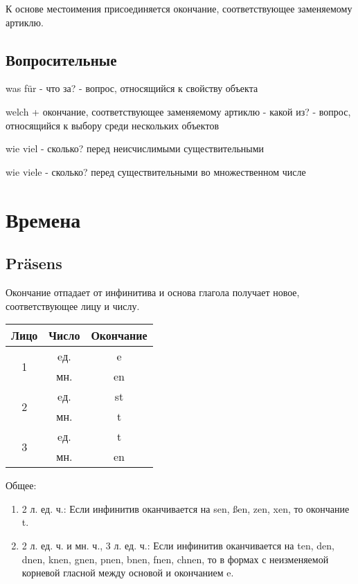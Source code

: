 \documentclass[oneside]{book}
\begin{document}
    К основе местоимения присоединяется окончание, соответствующее
    заменяемому артиклю.

    \section{Вопросительные}
    was f\"ur - что за? - вопрос, относящийся к свойству объекта

    welch + окончание, соответствующее заменяемому артиклю -
    какой из? - вопрос, относящийся к выбору среди нескольких объектов

    wie viel - сколько? перед неисчислимыми существительными

    wie viele - сколько? перед существительными во множественном числе

    \chapter{Времена}
    \section{Pr\"asens}
    Окончание отпадает от инфинитива и основа глагола
    получает новое, соответствующее лицу и числу.

    \begin{center}
        \begin{tabular}{|c|c|c|}
            \hline
            Лицо               & Число & Окончание \\ \hline
            \multirow{2}{*}{1} & eд.   & e         \\ \cline{2-3}
                               & мн.   & en        \\ \hline
            \multirow{2}{*}{2} & eд.   & st        \\ \cline{2-3}
                               & мн.   & t         \\ \hline
            \multirow{2}{*}{3} & eд.   & t         \\ \cline{2-3}
                               & мн.   & en        \\ \hline
        \end{tabular}
    \end{center}

    Общее:
    \begin{enumerate}
        \item 2 л. ед. ч.: Если инфинитив оканчивается на sen, \ss en, zen, xen,
        то окончание t.

        \item 2 л. ед. ч. и мн. ч., 3 л. ед. ч.: Если инфинитив оканчивается на
        ten, den, dnen, knen, gnen, pnen, bnen, fnen, chnen, то в формах
        с неизменяемой корневой гласной между основой и окончанием e.
    \end{enumerate}
\end{document}
